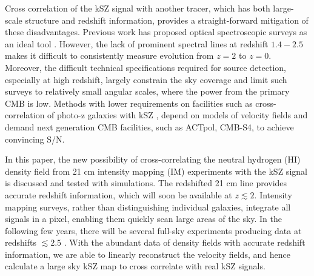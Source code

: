 Cross correlation of the kSZ signal with another tracer, which has both large-scale structure and redshift information, provides a straight-forward mitigation of these disadvantages. Previous work has proposed optical spectroscopic surveys as an ideal tool \cite{Hand12,Shao11,Li14}. 
However, the lack of prominent spectral lines at redshift $1.4-2.5$ makes it difficult to consistently measure evolution from $z=2$ to $z=0$. 
Moreover, the difficult technical specifications required for source detection, especially at high redshift, largely constrain the sky coverage and limit such surveys to relatively small angular scales, where the power from the primary CMB is low. Methods with lower requirements on facilities such as cross-correlation of photo-z galaxies with kSZ \cite{Hill16,Ferraro16}, depend on models of velocity fields and demand next generation CMB facilities, such as ACTpol, CMB-S4, to achieve convincing S/N.

In this paper, the new possibility of cross-correlating the neutral hydrogen (HI) density field from 21 cm intensity mapping (IM) experiments with the kSZ signal is discussed and tested with simulations. The redshifted 21 cm line provides accurate redshift information, which will soon be available at $z\lesssim2$.  
Intensity mapping surveys, rather than distinguishing individual galaxies, integrate all signals in a pixel, enabling them quickly scan large areas of the sky. In the following few years, there will be several full-sky experiments producing data at redshifts $\lesssim2.5$ 
\cite{2014CHIME, TIANLAI, HIRAX}.
With the abundant data of density fields with accurate redshift information, we are able to linearly reconstruct the velocity fields, and hence calculate a 
large sky kSZ map to cross correlate with real kSZ signals. 

